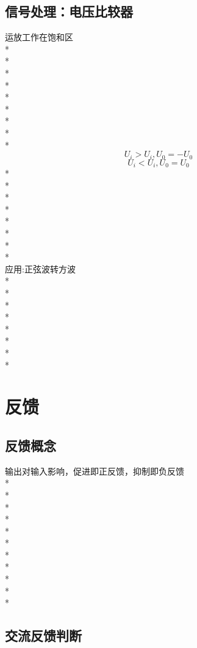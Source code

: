\documentclass[UTF8, fontset=none]{ctexart}
\begin{document}
\begin{multicols*}{8}
\subsection{信号处理：电压比较器}
运放工作在饱和区\\%
*\\
*\\
*\\
*\\
*\\
*\\
*\\
*\\
*\\
\[U_i > U_i, U_0 = -U_0\]
\[U_i < U_i, U_0 = U_0\]
*\\
*\\
*\\
*\\
*\\
*\\
*\\
*\\
应用:正弦波转方波\\
*\\
*\\
*\\
*\\
*\\
*\\
*\\
*\\

\section{反馈}
\subsection{反馈概念}
输出对输入影响，促进即正反馈，抑制即负反馈\\%
*\\
*\\
*\\
*\\
*\\
*\\
*\\
*\\
*\\
*\\
*
\subsection{交流反馈判断}

\end{multicols*}
\end{document}
